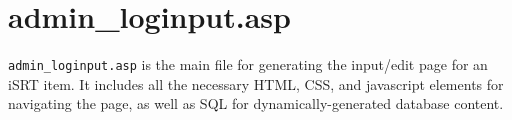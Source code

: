\section{admin\_loginput.asp}
\verb|admin_loginput.asp| is the main file for generating the input/edit page for an
iSRT item.  It includes all the necessary HTML, CSS, and javascript elements for
navigating the page, as well as SQL for dynamically-generated database content.


